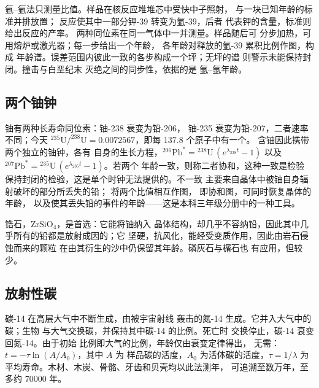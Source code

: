 氩–氩法只测量比值。样品在核反应堆堆芯中受快中子照射，
与一块已知年龄的标准并排放置；
反应使其中一部分钾-39 转变为氩-39，后者
代表钾的含量，标准则给出反应的产率。
两种同位素在同一气体中一并测量。样品随后可
分步加热，可用熔炉或激光器；每一步给出一个年龄，
各年龄对释放的氩-39 累积比例作图，构成
年龄谱。误差范围内彼此一致的各步构成一个坪；无坪的谱
则警示未能保持封闭。撞击与白垩纪末
灭绝之间的同步性，依据的是
氩–氩年龄。

\subsection*{两个铀钟}

铀有两种长寿命同位素：铀-238 衰变为铅-206，
铀-235 衰变为铅-207，二者速率不同；今天
$^{235}\mathrm{U}/^{238}\mathrm{U} = 0.0072567$，即每 137.8 个原子中有一个。
含铀因此携带两个独立的铀钟，各有
自身的生长方程，${}^{206}\mathrm{Pb}^* = {}^{238}\mathrm{U}\,(e^{\lambda_{238} t} - 1)$
以及 ${}^{207}\mathrm{Pb}^* = {}^{235}\mathrm{U}\,(e^{\lambda_{235} t} - 1)$。若两个
年龄一致，则称二者协和，这种一致是检验
保持封闭的检验，这是单个时钟无法提供的。不一致
主要来自晶体中被铀自身辐射破坏的部分所丢失的铅；
将两个比值相互作图，
即协和图，可同时恢复晶体的年龄，
以及使其丢失铅的事件的年龄——这是本科三年级分册中的一种工具。

锆石，$\mathrm{ZrSiO_4}$，是首选：它能将铀纳入
晶体结构，却几乎不容纳铅，因此其中几乎所有的铅都是放射成因的；它
坚硬，抗风化，能经受变质作用，因此由岩石侵蚀而来的颗粒
在由其衍生的沙中仍保留其年龄。磷灰石与榍石也
有应用，但较少。

\subsection*{放射性碳}

碳-14 在高层大气中不断生成，由被宇宙射线
轰击的氮-14 生成。它并入大气中的碳；生物
与大气交换碳，并保持其中碳-14 的比例。死亡时
交换停止，碳-14 衰变回氮-14。由于初始
比例即大气的比例，年龄仅由衰变定律得出，
无需：$t = -\tau \ln(A/A_0)$，其中 $A$ 为
样品碳的活度，$A_0$ 为活体碳的活度，$\tau =
1/\lambda$ 为平均寿命。木材、木炭、骨骼、牙齿和贝壳均以此法测年，
可追溯至数万年，至多约 \num{70000} 年。


